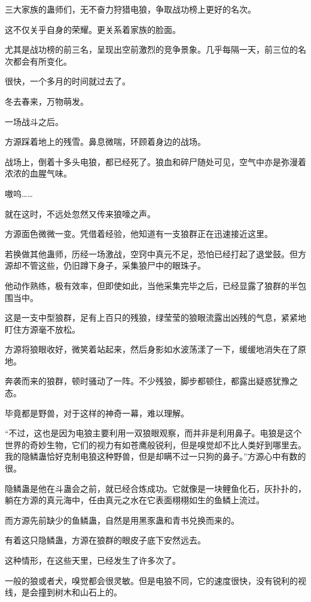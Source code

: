 \begin{this_body}
三大家族的蛊师们，无不奋力狩猎电狼，争取战功榜上更好的名次。

这不仅关乎自身的荣耀。更关系着家族的脸面。

尤其是战功榜的前三名，呈现出空前激烈的竞争景象。几乎每隔一天，前三位的名次都会有所变化。

很快，一个多月的时间就过去了。

冬去春来，万物萌发。

一场战斗之后。

方源踩着地上的残雪。鼻息微喘，环顾着身边的战场。

战场上，倒着十多头电狼，都已经死了。狼血和碎尸随处可见，空气中亦是弥漫着浓浓的血腥气味。

嗷呜……

就在这时，不远处忽然又传来狼嚎之声。

方源面色微微一变。凭借着经验，他知道有一支狼群正在迅速接近这里。

若换做其他蛊师，历经一场激战，空窍中真元不足，恐怕已经打起了退堂鼓。但方源却不管这些，仍旧蹲下身子，采集狼尸中的眼珠子。

他动作熟练，极有效率，但即使如此，当他采集完毕之后，已经显露了狼群的半包围当中。

这是一支中型狼群，足有上百只的残狼，绿莹莹的狼眼流露出凶残的气息，紧紧地盯住方源毫不放松。

方源将狼眼收好，微笑着站起来，然后身影如水波荡漾了一下，缓缓地消失在了原地。

奔袭而来的狼群，顿时骚动了一阵。不少残狼，脚步都顿住，都露出疑惑犹豫之态。

毕竟都是野兽，对于这样的神奇一幕，难以理解。

“不过，这也是因为电狼主要利用一双狼眼观察，而并非是利用鼻子。电狼是这个世界的奇妙生物，它们的视力有如苍鹰般锐利，但是嗅觉却不比人类好到哪里去。我的隐鳞蛊恰好克制电狼这种野兽，但是却瞒不过一只狗的鼻子。”方源心中有数的很。

隐鳞蛊是他在斗蛊会之前，就已经合炼成功。它就像是一块鲤鱼化石，灰扑扑的，躺在方源的真元海中，任由真元之水在它表面栩栩如生的鱼鳞上流过。

而方源先前缺少的鱼鳞蛊，自然是用黑豕蛊和青书兑换而来的。

有着这只隐鳞蛊，方源在狼群的眼皮子底下安然远去。

这种情形，在这些天里，已经发生了许多次了。

一般的狼或者犬，嗅觉都会很灵敏。但是电狼不同，它的速度很快，没有锐利的视线，是会撞到树木和山石上的。


\end{this_body}
